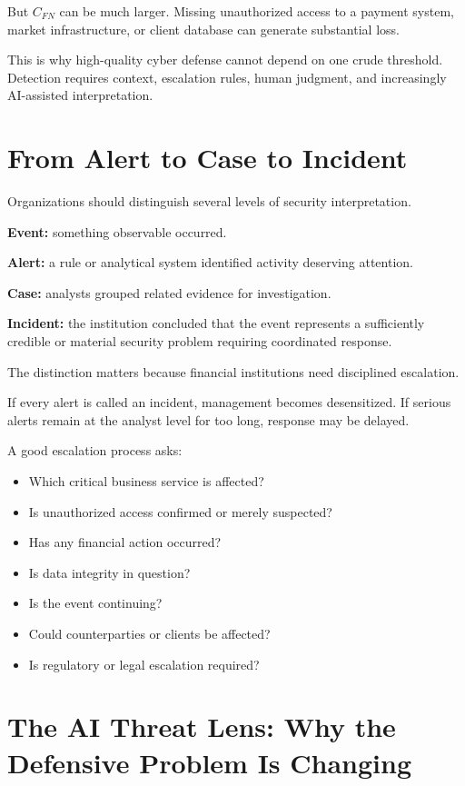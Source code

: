 But \(C_{FN}\) can be much larger. Missing unauthorized access to a payment system, market infrastructure, or client database can generate substantial loss.

This is why high-quality cyber defense cannot depend on one crude threshold. Detection requires context, escalation rules, human judgment, and increasingly AI-assisted interpretation.

\section{From Alert to Case to Incident}

Organizations should distinguish several levels of security interpretation.

\textbf{Event:} something observable occurred.

\textbf{Alert:} a rule or analytical system identified activity deserving attention.

\textbf{Case:} analysts grouped related evidence for investigation.

\textbf{Incident:} the institution concluded that the event represents a sufficiently credible or material security problem requiring coordinated response.

The distinction matters because financial institutions need disciplined escalation.

If every alert is called an incident, management becomes desensitized. If serious alerts remain at the analyst level for too long, response may be delayed.

A good escalation process asks:

\begin{itemize}
    \item Which critical business service is affected?
    \item Is unauthorized access confirmed or merely suspected?
    \item Has any financial action occurred?
    \item Is data integrity in question?
    \item Is the event continuing?
    \item Could counterparties or clients be affected?
    \item Is regulatory or legal escalation required?
\end{itemize}

\section{The AI Threat Lens: Why the Defensive Problem Is Changing}

